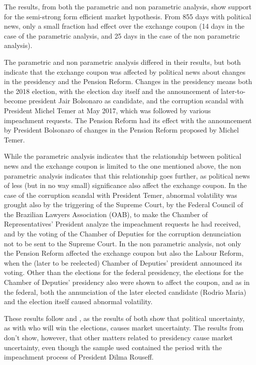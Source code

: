 \documentclass[a4paper]{article}
\begin{document}
The results, from both the parametric and non parametric analysis, show support for the semi-strong form efficient market hypothesis. From 855 days with political news, only a small fraction had effect over the exchange coupon (14 days in the case of the parametric analysis, and 25 days in the case of the non parametric analysis).

The parametric and non parametric analysis differed in their results, but both indicate that the exchange coupon was affected by political news about changes in the presidency and the Pension Reform. Changes in the presidency means both the 2018 election, with the election day itself and the announcement of later-to-become president Jair Bolsonaro as candidate, and the corruption scandal with President Michel Temer at May 2017, which was followed by various impeachment requests. The Pension Reform had its effect with the announcement by President Bolsonaro of changes in the Pension Reform proposed by Michel Temer.

While the parametric analysis indicates that the relationship between political news and the exchange coupon is limited to the one mentioned above, the non parametric analysis indicates that this relationship goes further, as political news of less (but in no way small) significance also affect the exchange coupon. In the case of the corruption scandal with President Temer, abnormal volatility was grought also by the triggering of the Supreme Court, by the Federal Council of the Brazilian Lawyers Association (OAB), to make the Chamber of Representatives' President analyze the impeachment requests he had received, and by the voting of the Chamber of Deputies for the corruption denunciation not to be sent to the Supreme Court. In the non parametric analysis, not only the Pension Reform affected the exchange coupon but also the Labour Reform, when the (later to be reelected) Chamber of Deputies' president announced its voting. Other than the elections for the federal presidency, the elections for the Chamber of Deputies' presidency also were shown to affect the coupon, and as in the federal, both the annunciation of the later elected candidate (Rodrio Maria) and the election itself caused abnormal volatility.


These results follow \cite{smales2015} and \cite{marquessantos2016}, as the results of both show that political uncertainty, as with who will win the elections, causes market uncertainty. The results from \cite{marquessantos2016} don't show, however, that other matters related to presidency cause market uncertainty, even though the sample used contained the period with the impeachment process of President Dilma Rouseff.




\begin{comment}

The best forecast for the asset price in the next period is always the current price. (quem disse isso? acho que propio Fama)
The best estimate for the asset return in the long term is always the normal return for the risk of the asset (quem fisse isso?)

\end{comment}
\end{document}
